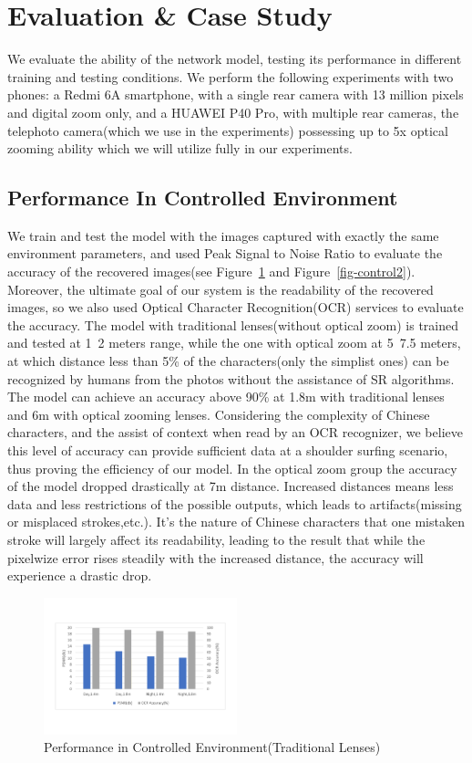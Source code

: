 \section{Evaluation \& Case Study}
\label{sec-evaluation}

We evaluate the ability of the network model, testing its performance in different training and testing conditions. We perform the following experiments with two phones: a Redmi 6A smartphone, with a single rear camera with 13 million pixels and digital zoom only, and a HUAWEI P40 Pro, with multiple rear cameras, the telephoto camera(which we use in the experiments) possessing up to 5x optical zooming ability which we will utilize fully in our experiments. 
\subsection{Performance In Controlled Environment}
We train and test the model with the images captured with exactly the same environment parameters, and used Peak Signal to Noise Ratio to evaluate the accuracy of the recovered images(see Figure~\ref{fig-control} and Figure~\ref{fig-control2}). Moreover, the ultimate goal of our system is the readability of the recovered images, so we also used Optical Character Recognition(OCR) services to evaluate the accuracy. The model with traditional lenses(without optical zoom) is trained and tested at 1~2 meters range, while the one with optical zoom at 5~7.5 meters, at which distance less than 5\% of the characters(only the simplist ones) can be recognized by humans from the photos without the assistance of SR algorithms. The model can achieve an accuracy above 90\% at 1.8m with traditional lenses and 6m with optical zooming lenses. Considering the complexity of Chinese characters, and the assist of context when read by an OCR recognizer, we believe this level of accuracy can provide sufficient data at a shoulder surfing scenario, thus proving the efficiency of our model.
In the optical zoom group the accuracy of the model dropped drastically at 7m distance. Increased distances means less data and less restrictions of the possible outputs, which leads to artifacts(missing or misplaced strokes,etc.). It's the nature of Chinese characters that one mistaken stroke will largely affect its readability, leading to the result that while the pixelwize error rises steadily with the increased distance, the accuracy will experience a drastic drop.

\begin{figure}
 \centering
    \includegraphics[width=0.5\textwidth]{./pic/table1.pdf}
    \caption{Performance in Controlled Environment(Traditional Lenses)}
    \label{fig-control}
\end{figure}

